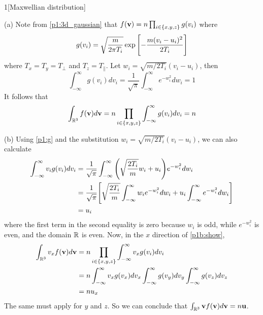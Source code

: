 \documentclass[12pt]{article}
\begin{document}
\begin{problem}{1}[Maxwellian distribution]
\begin{solution}
    (a) Note from \eqref{p1:3d_gaussian} that
    $f(\vb{v})=n\prod_{i\in\qty{x,y,z}}g(v_i)$ where
    \begin{equation}\label{p1:g}
        g(v_i)=\sqrt{\frac{m}{2\pi
        T_i}}\exp\qty[-\frac{m(v_i-u_i)^2}{2T_i}]
    \end{equation}
    where $T_x=T_y=T_\perp$ and $T_z=T_\|$. Let $w_i=\sqrt{m/2T_i}(v_i-u_i)$,
    then
    \begin{equation}
        \int_{-\infty}^\infty g(v_i) dv_i
        =\frac1{\sqrt{\pi}}\int_{-\infty}^\infty e^{-w_i^2}dw_i
        =1
    \end{equation}
    It follows that
    \begin{equation}
        \int_{\mathbb{R}^3}f(\vb{v})d\vb{v}
        =n\prod_{i\in\qty{x,y,z}}\int_{-\infty}^\infty g(v_i)dv_i
        =n
    \end{equation}

    (b) Using \eqref{p1:g} and the substitution $w_i=\sqrt{m/2T_i}(v_i-u_i)$, 
    we can also calculate
    \begin{align}\label{p1b:integrate_vi}
        \int_{-\infty}^\infty v_ig(v_i)dv_i
        &=\frac1{\sqrt\pi}\int_{-\infty}^\infty
        \qty(\sqrt{\frac{2T_i}{m}}w_i+u_i)e^{-w_i^2}dw_i
            \notag\\
        &=\frac{1}{\sqrt\pi}\qty[
            \sqrt{\frac{2T_i}{m}}\int_{-\infty}^\infty w_ie^{-w_i^2}dw_i
            +u_i\int_{-\infty}^\infty e^{-w_i^2}dw_i
        ]\notag\\
        &=u_i
    \end{align}
    where the first term in the second equality is zero because $w_i$ is odd,
    while $e^{-w_i^2}$ is even, and the domain $\mathbb{R}$ is even. Now, in the $x$
    direction of \eqref{p1b:show},
    \begin{align}
        \int_{\mathbb{R}^3} v_xf(\vb{v})d\vb{v}
        &=n\prod_{i\in\qty{x,y,z}}\int_{-\infty}^\infty v_xg(v_i)dv_i\notag\\
        &=n\int_{-\infty}^\infty v_xg(v_x)dv_x\int_{-\infty}^\infty g(v_y)dv_y
            \int_{-\infty}^\infty g(v_z)dv_z\notag\\
        &=nu_x
    \end{align}
    The same must apply for $y$ and $z$. So we can conclude that 
    $\int_{\mathbb{R}^3}\vb{v}f(\vb{v})d\vb{v}=n\vb{u}$.


\end{solution}
\end{problem}
\end{document}
